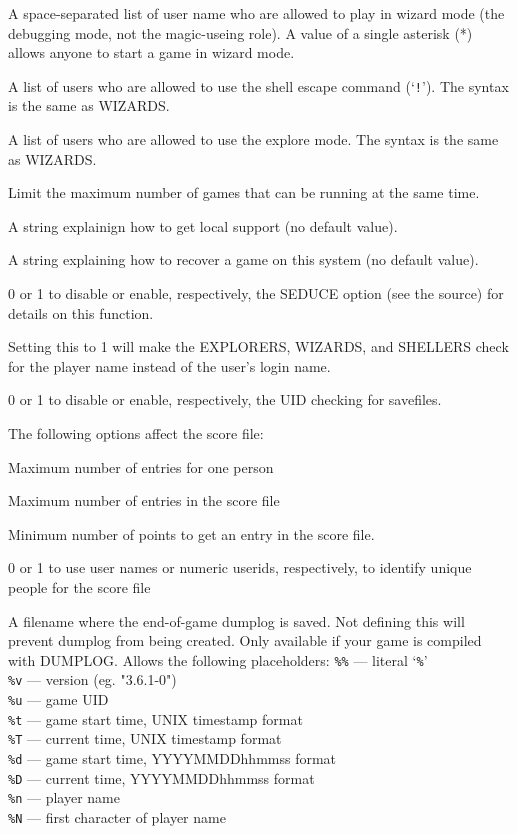 \blist{}
\item[\ib{WIZARDS}]
A space-separated list of user name who are allowed to play in wizard
mode (the debugging mode, not the magic-useing role). A value of a single
asterisk (*) allows anyone to start a game in wizard mode.
\item[\ib{SHELLERS}]
A list of users who are allowed to use the shell escape command (`{\tt !}').
The syntax is the same as WIZARDS.
\item[\ib{EXPLORERS}]
A list of users who are allowed to use the explore mode.
The syntax is the same as WIZARDS.
\item[\ib{MAXPLAYERS}]
Limit the maximum number of games that can be running at the same time.
\item[\ib{SUPPORT}]
A string explainign how to get local support (no default value).
\item[\ib{RECOVER}]
A string explaining how to recover a game on this system (no default value).
\item[\ib{SEDUCE}]
0 or 1 to disable or enable, respectively, the SEDUCE option (see the source)
for details on this function.
\item[\ib{CHECK\verb+_+PLNAME}]
Setting this to 1 will make the EXPLORERS, WIZARDS, and SHELLERS check
for the player name instead of the user's login name.
\item[\ib{CHECK\verb+_+SAVE\verb+_+UID}]
0 or 1 to disable or enable, respectively, the UID checking for savefiles.
\elist

The following options affect the score file:
\blist {}
\item[\ib{PERSMAX}]
Maximum number of entries for one person
\item[\ib{ENTRYMAX}]
Maximum number of entries in the score file
\item[\ib{POINTSMIN}]
Minimum number of points to get an entry in the score file.
\item[\ib{PERS\verb+_+IS\verb+_+UID}]
0 or 1 to use user names or numeric userids, respectively, to identify
unique people for the score file
\item[\ib{DUMPLOGFILE}]
A filename where the end-of-game dumplog is saved.
Not defining this will prevent dumplog from being created. Only available
if your game is compiled with DUMPLOG. Allows the following placeholders:
{\tt \%\%}  --- literal `{\tt \%}'\\
{\tt \%v}  --- version (eg. "3.6.1-0")\\
{\tt \%u}  --- game UID\\
{\tt \%t}  --- game start time, UNIX timestamp format\\
{\tt \%T}  --- current time, UNIX timestamp format\\
{\tt \%d}  --- game start time, YYYYMMDDhhmmss format\\
{\tt \%D}  --- current time, YYYYMMDDhhmmss format\\
{\tt \%n}  --- player name\\
{\tt \%N}  --- first character of player name
\elist

